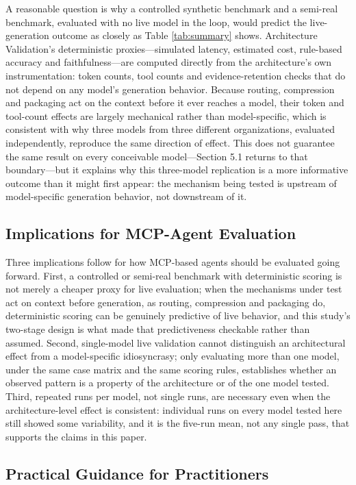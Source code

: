 A reasonable question is why a controlled synthetic benchmark and a semi-real benchmark, evaluated with no live model in the loop, would predict the live-generation outcome as closely as Table \ref{tab:summary} shows. Architecture Validation's deterministic proxies---simulated latency, estimated cost, rule-based accuracy and faithfulness---are computed directly from the architecture's own instrumentation: token counts, tool counts and evidence-retention checks that do not depend on any model's generation behavior. Because routing, compression and packaging act on the context before it ever reaches a model, their token and tool-count effects are largely mechanical rather than model-specific, which is consistent with why three models from three different organizations, evaluated independently, reproduce the same direction of effect. This does not guarantee the same result on every conceivable model---Section 5.1 returns to that boundary---but it explains why this three-model replication is a more informative outcome than it might first appear: the mechanism being tested is upstream of model-specific generation behavior, not downstream of it.

\subsection{Implications for MCP-Agent Evaluation}

Three implications follow for how MCP-based agents should be evaluated going forward. First, a controlled or semi-real benchmark with deterministic scoring is not merely a cheaper proxy for live evaluation; when the mechanisms under test act on context before generation, as routing, compression and packaging do, deterministic scoring can be genuinely predictive of live behavior, and this study's two-stage design is what made that predictiveness checkable rather than assumed. Second, single-model live validation cannot distinguish an architectural effect from a model-specific idiosyncrasy; only evaluating more than one model, under the same case matrix and the same scoring rules, establishes whether an observed pattern is a property of the architecture or of the one model tested. Third, repeated runs per model, not single runs, are necessary even when the architecture-level effect is consistent: individual runs on every model tested here still showed some variability, and it is the five-run mean, not any single pass, that supports the claims in this paper.

\subsection{Practical Guidance for Practitioners}

